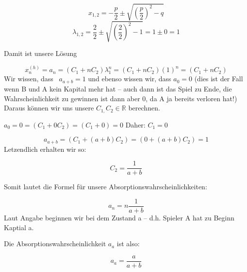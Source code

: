 \begin{uebsp}
\begin{Answer}

\begin{equation*}
x_{1,2}=-{\frac{p}{2}}\pm \sqrt{(\frac{p}{2})^{2}-q}
\end{equation*}
\begin{equation*}
\lambda _{1,2}=\frac{2}{2}\pm \sqrt{(\frac{2}{2})^{2}-1}=1\pm 0=1
\end{equation*}




{
Damit ist unsere L\"osung }

\begin{equation*}
x_{n}^{(h)}=a_{n}=(C_{1}+\mathit{nC}_{2})\lambda
_{1}^{n}=(C_{1}+\mathit{nC}_{2})(1)^{n}=(C_{1}+\mathit{nC}_{2})
\end{equation*}
{
Wir wissen, dass \  $a_{a+b}=1$ und ebenso wissen wir, dass  $a_{0}=0$
(dies ist der Fall wenn B und A kein Kapital mehr hat -- auch dann ist
das Spiel zu Ende, die Wahrscheinlichkeit zu gewinnen ist dann aber 0,
da A ja bereits verloren hat!) Daraus k\"onnen wir uns unsere 
$C_{1,}C_{2}\in \mathbb{R}$ berechnen.}



{
 $a_{0}=0=(C_{1}+0C_{2})=(C_{1}+0)=0$ Daher:  $C_{1}=0$ }



\begin{equation*}
a_{a+b}=(C_{1}+(a+b)C_{2})=(0+(a+b)C_{2})=1
\end{equation*}
{
Letzendlich erhalten wir so:}

\begin{equation*}
C_{2}=\frac{1}{a+b}
\end{equation*}


{
Somit lautet die Formel f\"ur unsere Absorptionswahrscheinlichkeiten:}



\begin{equation*}
a_{n}=n\frac{1}{a+b}
\end{equation*}
{
Laut Angabe beginnen wir bei dem Zustand a -- d.h. Spieler A hat zu
Beginn Kaptial a.}



{
Die Absorptionswahrscheinlichkeit  $a_{a}$ ist also:}



\begin{equation*}
a_{a}=\frac{a}{a+b}
\end{equation*}

\end{Answer}
\end{uebsp}
